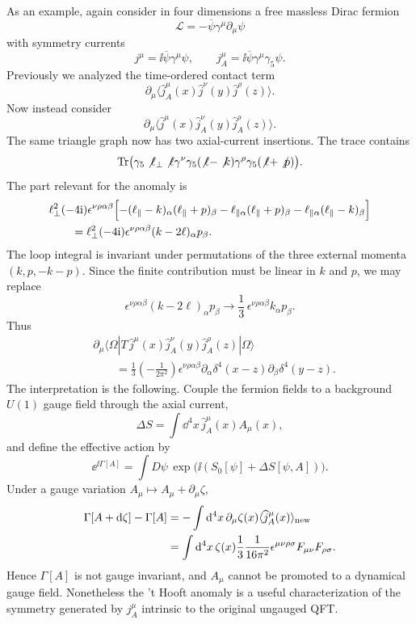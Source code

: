 As an example, again consider in four dimensions a free massless Dirac
fermion
\[
  \mathcal L=-\overline\psi\gamma^\mu\partial_\mu\psi
\]
with symmetry currents
\[
  j^\mu=\ii\overline\psi\gamma^\mu\psi,
  \qquad
  j_A^\mu=\ii\overline\psi\gamma^\mu\gamma_5\psi .
\]
Previously we analyzed the time-ordered contact term
\[
  \partial_\mu
  \langle\widehat j_A^\mu(x)\widehat j^\nu(y)\widehat j^\rho(z)\rangle .
\]
Now instead consider
\[
  \partial_\mu
  \langle\widehat j^\mu(x)\widehat j_A^\nu(y)\widehat j_A^\rho(z)\rangle .
\]
The same triangle graph now has two axial-current insertions.  The trace
contains
\[
  \operatorname{Tr}
  \bigl(
    \gamma_5\not\ell_\perp\not\ell\gamma^\nu\gamma_5
    (\not\ell-\not k)\gamma^\rho\gamma_5(\not\ell+\not p)
  \bigr).
\]
The part relevant for the anomaly is
\[
\begin{aligned}
  &\ell_\perp^2(-4\mathrm{i})\epsilon^{\nu\rho\alpha\beta}
  \Bigl[
    -(\ell_\parallel-k)_\alpha(\ell_\parallel+p)_\beta
    -\ell_{\parallel\alpha}(\ell_\parallel+p)_\beta
    -\ell_{\parallel\alpha}(\ell_\parallel-k)_\beta
  \Bigr]
\\
  &\qquad =
  \ell_\perp^2(-4\mathrm{i})\epsilon^{\nu\rho\alpha\beta}
  (k-2\ell)_\alpha p_\beta .
\end{aligned}
\]
The loop integral is invariant under permutations of the three external
momenta \((k,p,-k-p)\).  Since the finite contribution must be linear in
\(k\) and \(p\), we may replace
\[
  \epsilon^{\nu\rho\alpha\beta}(k-2\ell)_\alpha p_\beta
  \longrightarrow
  \frac13\,\epsilon^{\nu\rho\alpha\beta}k_\alpha p_\beta .
\]
Thus
\[
\begin{aligned}
  &\partial_\mu
  \langle\Omega|
  T\,\widehat j^\mu(x)\widehat j_A^\nu(y)\widehat j_A^\rho(z)
  |\Omega\rangle
\\
  &\qquad =
  \frac13\left(-\frac1{2\pi^2}\right)
  \epsilon^{\nu\rho\alpha\beta}
  \partial_\alpha\delta^4(x-z)
  \partial_\beta\delta^4(y-z).
\end{aligned}
\]
The interpretation is the following.  Couple the fermion fields to a
background \(U(1)\) gauge field through the axial current,
\[
  \Delta S=\int\dd^4x\,\widehat j_A^\mu(x)A_\mu(x),
\]
and define the effective action by
\[
  \ee^{\ii\Gamma[A]}
  =
  \int D\psi\,\exp\bigl(\ii(S_0[\psi]+\Delta S[\psi,A])\bigr).
\]
Under a gauge variation \(A_\mu\mapsto A_\mu+\partial_\mu\zeta\),
\[
\begin{aligned}
  \Gamma[A+\mathrm{d}\zeta]-\Gamma[A]
  &=
  -\int\mathrm{d}^4x\,\partial_\mu\zeta(x)
  \langle\widehat j_A^\mu(x)\rangle_{\rm new}
\\
  &=
  \int\mathrm{d}^4x\,\zeta(x)
  \frac13\frac1{16\pi^2}
  \epsilon^{\mu\nu\rho\sigma}F_{\mu\nu}F_{\rho\sigma}.
\end{aligned}
\]
Hence \(\Gamma[A]\) is not gauge invariant, and \(A_\mu\) cannot be
promoted to a dynamical gauge field.  Nonetheless the 't Hooft
anomaly is a useful characterization of the symmetry generated by
\(j_A^\mu\) intrinsic to the original ungauged QFT.

